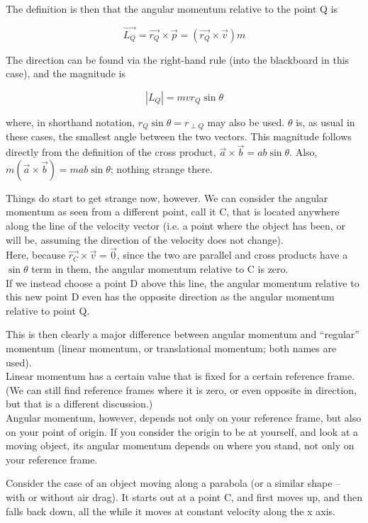 \documentclass[8.01x]{subfiles}
\begin{document}
The definition is then that the angular momentum relative to the point Q is

\begin{equation}
\vec{L_Q} = \vec{r_Q} \times \vec{p} = (\vec{r_Q} \times \vec{v}) m
\end{equation}

The direction can be found via the right-hand rule (into the blackboard in this case), and the magnitude is

\begin{equation}
|L_Q| = m v r_Q \sin \theta
\end{equation}

where, in shorthand notation, $r_Q \sin \theta = r_{\perp Q}$ may also be used. $\theta$ is, as usual in these cases, the smallest angle between the two vectors. This magnitude follows directly from the definition of the cross product, $\vec{a} \times \vec{b} = a b \sin \theta$. Also, $m(\vec{a} \times \vec{b}) = m a b \sin \theta$; nothing strange there.

Things do start to get strange now, however. We can consider the angular momentum as seen from a different point, call it C, that is located anywhere along the line of the velocity vector (i.e. a point where the object has been, or will be, assuming the direction of the velocity does not change).\\
Here, because $\vec{r_{C}} \times \vec{v} = \vec{0}$, since the two are parallel and cross products have a $\sin \theta$ term in them, the angular momentum relative to C is zero.\\
If we instead choose a point D above this line, the angular momentum relative to this new point D even has the opposite direction as the angular momentum relative to point Q.

This is then clearly a major difference between angular momentum and ``regular'' momentum (linear momentum, or translational momentum; both names are used).\\
Linear momentum has a certain value that is fixed for a certain reference frame. (We can still find reference frames where it is zero, or even opposite in direction, but that is a different discussion.)\\
Angular momentum, however, depends not only on your reference frame, but also on your point of origin. If you consider the origin to be at yourself, and look at a moving object, its angular momentum depends on where you stand, not only on your reference frame.

Consider the case of an object moving along a parabola (or a similar shape -- with or without air drag). It starts out at a point C, and first moves up, and then falls back down, all the while it moves at constant velocity along the x axis.
\end{document}
